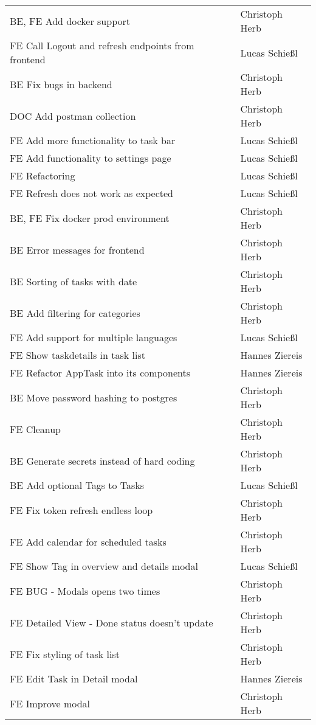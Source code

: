 \begin{longtable}{ll}
BE, FE Add docker support & Christoph Herb \\
FE Call Logout and refresh endpoints from frontend & Lucas Schießl \\
BE Fix bugs in backend & Christoph Herb \\
DOC Add postman collection & Christoph Herb \\
FE Add more functionality to task bar & Lucas Schießl \\
FE Add functionality to settings page & Lucas Schießl \\
FE Refactoring & Lucas Schießl \\
FE Refresh does not work as expected & Lucas Schießl \\
BE, FE Fix docker prod environment & Christoph Herb \\
BE Error messages for frontend & Christoph Herb \\
BE Sorting of tasks with date & Christoph Herb \\
BE Add filtering for categories & Christoph Herb \\
FE Add support for multiple languages & Lucas Schießl \\
FE Show taskdetails in task list & Hannes Ziereis \\
FE Refactor AppTask into its components & Hannes Ziereis \\
BE Move password hashing to postgres & Christoph Herb \\
FE Cleanup & Christoph Herb \\
BE Generate secrets instead of hard coding & Christoph Herb \\
BE Add optional Tags to Tasks & Lucas Schießl \\
FE Fix token refresh endless loop & Christoph Herb \\
FE Add calendar for scheduled tasks & Christoph Herb \\
FE Show Tag in overview and details modal & Lucas Schießl \\
FE BUG - Modals opens two times & Christoph Herb \\
FE Detailed View - Done status doesn't update & Christoph Herb \\
FE Fix styling of task list & Christoph Herb \\
FE  Edit Task in Detail modal & Hannes Ziereis \\
FE Improve modal & Christoph Herb \\
\end{longtable}
